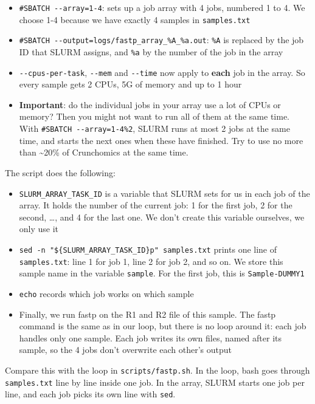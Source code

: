 \documentclass[
  letterpaper,
  DIV=11,
  numbers=noendperiod]{scrreprt}
\providecommand{\tightlist}{%
  \setlength{\itemsep}{0pt}\setlength{\parskip}{0pt}}
\begin{document}
\begin{tcolorbox}
\begin{itemize}
\tightlist
\item
  \texttt{\#SBATCH\ -\/-array=1-4}: sets up a job array with 4 jobs,
  numbered 1 to 4. We choose 1-4 because we have exactly 4 samples in
  \texttt{samples.txt}
\item
  \texttt{\#SBATCH\ -\/-output=logs/fastp\_array\_\%A\_\%a.out}:
  \texttt{\%A} is replaced by the job ID that SLURM assigns, and
  \texttt{\%a} by the number of the job in the array
\item
  \texttt{-\/-cpus-per-task}, \texttt{-\/-mem} and \texttt{-\/-time} now
  apply to \textbf{each} job in the array. So every sample gets 2 CPUs,
  5G of memory and up to 1 hour
\item
  \textbf{Important}: do the individual jobs in your array use a lot of
  CPUs or memory? Then you might not want to run all of them at the same
  time. With \texttt{\#SBATCH\ -\/-array=1-4\%2}, SLURM runs at most 2
  jobs at the same time, and starts the next ones when these have
  finished. Try to use no more than \textasciitilde20\% of Crunchomics
  at the same time.
\end{itemize}

The script does the following:

\begin{itemize}
\tightlist
\item
  \texttt{SLURM\_ARRAY\_TASK\_ID} is a variable that SLURM sets for us
  in each job of the array. It holds the number of the current job: 1
  for the first job, 2 for the second, \ldots, and 4 for the last one.
  We don't create this variable ourselves, we only use it
\item
  \texttt{sed\ -n\ "\$\{SLURM\_ARRAY\_TASK\_ID\}p"\ samples.txt} prints
  one line of \texttt{samples.txt}: line 1 for job 1, line 2 for job 2,
  and so on. We store this sample name in the variable \texttt{sample}.
  For the first job, this is \texttt{Sample-DUMMY1}
\item
  \texttt{echo} records which job works on which sample
\item
  Finally, we run fastp on the R1 and R2 file of this sample. The fastp
  command is the same as in our loop, but there is no loop around it:
  each job handles only one sample. Each job writes its own files, named
  after its sample, so the 4 jobs don't overwrite each other's output
\end{itemize}

Compare this with the loop in \texttt{scripts/fastp.sh}. In the loop,
bash goes through \texttt{samples.txt} line by line inside one job. In
the array, SLURM starts one job per line, and each job picks its own
line with \texttt{sed}.


\end{tcolorbox}
\end{document}
